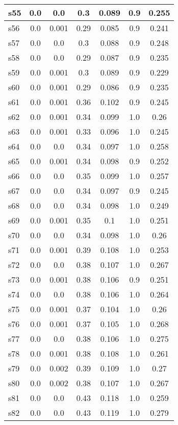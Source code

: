 \documentclass{article}
\begin{document}
\begin{tabular}{|l|c|c|c|c|c|c|}
\hline
s55 &0.0 & 0.0 & 0.3 & 0.089 & 0.9 & 0.255\\
\hline
s56 &0.0 & 0.001 & 0.29 & 0.085 & 0.9 & 0.241\\
\hline
s57 &0.0 & 0.0 & 0.3 & 0.088 & 0.9 & 0.248\\
\hline
s58 &0.0 & 0.0 & 0.29 & 0.087 & 0.9 & 0.235\\
\hline
s59 &0.0 & 0.001 & 0.3 & 0.089 & 0.9 & 0.229\\
\hline
s60 &0.0 & 0.001 & 0.29 & 0.086 & 0.9 & 0.235\\
\hline
s61 &0.0 & 0.001 & 0.36 & 0.102 & 0.9 & 0.245\\
\hline
s62 &0.0 & 0.001 & 0.34 & 0.099 & 1.0 & 0.26\\
\hline
s63 &0.0 & 0.001 & 0.33 & 0.096 & 1.0 & 0.245\\
\hline
s64 &0.0 & 0.0 & 0.34 & 0.097 & 1.0 & 0.258\\
\hline
s65 &0.0 & 0.001 & 0.34 & 0.098 & 0.9 & 0.252\\
\hline
s66 &0.0 & 0.0 & 0.35 & 0.099 & 1.0 & 0.257\\
\hline
s67 &0.0 & 0.0 & 0.34 & 0.097 & 0.9 & 0.245\\
\hline
s68 &0.0 & 0.0 & 0.34 & 0.098 & 1.0 & 0.249\\
\hline
s69 &0.0 & 0.001 & 0.35 & 0.1 & 1.0 & 0.251\\
\hline
s70 &0.0 & 0.0 & 0.34 & 0.098 & 1.0 & 0.26\\
\hline
s71 &0.0 & 0.001 & 0.39 & 0.108 & 1.0 & 0.253\\
\hline
s72 &0.0 & 0.0 & 0.38 & 0.107 & 1.0 & 0.267\\
\hline
s73 &0.0 & 0.001 & 0.38 & 0.106 & 0.9 & 0.251\\
\hline
s74 &0.0 & 0.0 & 0.38 & 0.106 & 1.0 & 0.264\\
\hline
s75 &0.0 & 0.001 & 0.37 & 0.104 & 1.0 & 0.26\\
\hline
s76 &0.0 & 0.001 & 0.37 & 0.105 & 1.0 & 0.268\\
\hline
s77 &0.0 & 0.0 & 0.38 & 0.106 & 1.0 & 0.275\\
\hline
s78 &0.0 & 0.001 & 0.38 & 0.108 & 1.0 & 0.261\\
\hline
s79 &0.0 & 0.002 & 0.39 & 0.109 & 1.0 & 0.27\\
\hline
s80 &0.0 & 0.002 & 0.38 & 0.107 & 1.0 & 0.267\\
\hline
s81 &0.0 & 0.0 & 0.43 & 0.118 & 1.0 & 0.259\\
\hline
s82 &0.0 & 0.0 & 0.43 & 0.119 & 1.0 & 0.279\\

\end{tabular}
\end{document}
